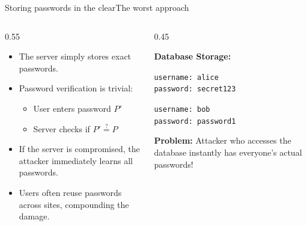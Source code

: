 \ifdefined\PRESENTATION\else\PassOptionsToClass{handout}{beamer}\fi\documentclass[aspectratio=169, lualatex]{beamer}
\begin{document}
\begin{frame}{Storing passwords in the clear}{The worst approach}
	\begin{columns}[c]
		\begin{column}{0.55\textwidth}
			\begin{itemize}
				\item The server simply stores exact passwords.
				\item Password verification is trivial:
				      \begin{itemize}
					      \item User enters password $P'$
					      \item Server checks if $P' \stackrel{?}{=} P$
				      \end{itemize}
				\item If the server is compromised, the attacker immediately learns all passwords.
				\item Users often reuse passwords across sites, compounding the damage.
			\end{itemize}
		\end{column}
		\begin{column}{0.45\textwidth}
			\begin{tcolorbox}[colback=black!5!white,colframe=ciphergray]
				\textbf{Database Storage:}

				\vspace{0.2cm}

				\texttt{username: alice}\\
				\texttt{password: secret123}

				\vspace{0.2cm}

				\texttt{username: bob}\\
				\texttt{password: password1}

				\vspace{0.3cm}

				\textcolor{cipherprimary}{\textbf{Problem:} \small Attacker who accesses the database instantly has everyone's actual passwords!}
			\end{tcolorbox}
		\end{column}
	\end{columns}
\end{frame}
\end{document}
